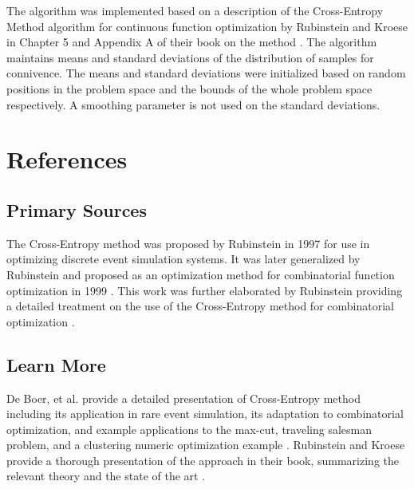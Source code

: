 \documentclass[a4paper, 11pt]{article}
\begin{document}
The algorithm was implemented based on a description of the Cross-Entropy Method algorithm for continuous function optimization by Rubinstein and Kroese in Chapter 5 and Appendix A of their book on the method \cite{Rubinstein2004}. The algorithm maintains means and standard deviations  of the distribution of samples for connivence. The means and standard deviations were initialized based on random positions in the problem space and the bounds of the whole problem space respectively. A smoothing parameter is not used on the standard deviations.




\section{References}
\label{sec:references}

% 
% 
\subsection{Primary Sources}
The Cross-Entropy method was proposed by Rubinstein in 1997 \cite{Rubinstein1997} for use in optimizing discrete event simulation systems. It was later generalized by Rubinstein and proposed as an optimization method for combinatorial function optimization in 1999 \cite{Rubinstein1999}.
This work was further elaborated by Rubinstein providing a detailed treatment on the use of the Cross-Entropy method for combinatorial optimization \cite{Rubinstein2001}.



% 
% 
\subsection{Learn More}
De Boer, et al. provide a detailed presentation of Cross-Entropy method including its application in rare event simulation, its adaptation to combinatorial optimization, and example applications to the max-cut, traveling salesman problem, and a clustering numeric optimization example \cite{DeBoer2005}.
Rubinstein and Kroese provide a thorough presentation of the approach in their book, summarizing the relevant theory and the state of the art \cite{Rubinstein2004}. 
\end{document}
